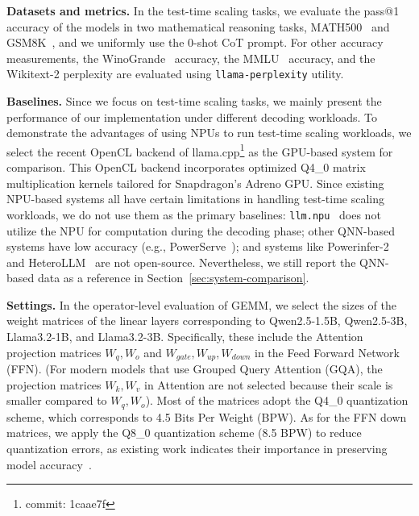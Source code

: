 \textbf{Datasets and metrics.} In the test-time scaling tasks, we evaluate the pass@1 accuracy of the models in two mathematical reasoning tasks, MATH500~\cite{math} and GSM8K~\cite{gsm8k}, and we uniformly use the 0-shot CoT prompt. For other accuracy measurements, the WinoGrande~\cite{winogrande} accuracy, the MMLU~\cite{mmlu} accuracy, and the Wikitext-2 perplexity are evaluated using \texttt{llama-perplexity} utility.

\textbf{Baselines.} Since we focus on test-time scaling tasks, we mainly present the performance of our implementation under different decoding workloads. To demonstrate the advantages of using NPUs to run test-time scaling workloads, we select the recent OpenCL backend of llama.cpp\footnote{commit: 1caae7f} as the GPU-based system for comparison. This OpenCL backend incorporates optimized Q4\_0 matrix multiplication kernels tailored for Snapdragon's Adreno GPU. Since existing NPU-based systems all have certain limitations in handling test-time scaling workloads, we do not use them as the primary baselines: \texttt{llm.npu}~\cite{mllm-npu} does not utilize the NPU for computation during the decoding phase; other QNN-based systems have low accuracy (e.g., PowerServe~\cite{powerserve}); and systems like Powerinfer-2~\cite{powerinfer2} and HeteroLLM~\cite{heterollm} are not open-source. Nevertheless, we still report the QNN-based data as a reference in Section~\ref{sec:system-comparison}.


\textbf{Settings.} In the operator-level evaluation of GEMM, we select the sizes of the weight matrices of the linear layers corresponding to Qwen2.5-1.5B, Qwen2.5-3B, Llama3.2-1B, and Llama3.2-3B. Specifically, these include the Attention projection matrices $W_q,W_o$ and $W_{gate}, W_{up}, W_{down}$ in the Feed Forward Network (FFN). (For modern models that use Grouped Query Attention (GQA), the projection matrices $W_k,W_v$ in Attention are not selected because their scale is smaller compared to $W_q,W_o$). Most of the matrices adopt the Q4\_0 quantization scheme, which corresponds to 4.5 Bits Per Weight (BPW). As for the FFN down matrices, we apply the Q8\_0 quantization scheme (8.5 BPW) to reduce quantization errors, as existing work indicates their importance in preserving model accuracy~\cite{kovaleva2024systematic,duquant,lin2023emergent}.

